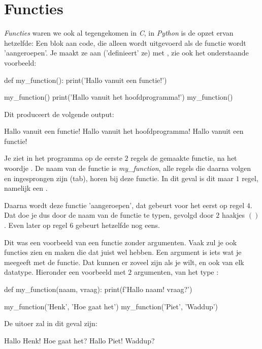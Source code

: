 \newpage

\section{Functies}
\textit{Functies} waren we ook al tegengekomen in \textit{C}, in \textit{Python} is de opzet ervan hetzelfde: Een blok aan code, die alleen wordt uitgevoerd als de functie wordt 'aangeroepen'. Je maakt ze aan ('definieert' ze) met , zie ook het onderstaande voorbeeld:

\begin{python}
def my_function():
    print('Hallo vanuit een functie!') 

my_function()
print('Hallo vanuit het hoofdprogramma!')
my_function()
\end{python}

Dit produceert de volgende output:

\begin{python}
Hallo vanuit een functie!
Hallo vanuit het hoofdprogramma!
Hallo vanuit een functie!
\end{python}

Je ziet in het programma op de eerste $2$ regels de gemaakte functie, na het woordje . De naam van de functie is \textit{my\_function}, alle regels die daarna volgen en ingesprongen zijn (tab), horen bij deze functie. 
In dit geval is dit maar $1$ regel, namelijk een . 

Daarna wordt deze functie 'aangeroepen', dat gebeurt voor het eerst op regel $4$. Dat doe je dus door de naam van de functie te typen, gevolgd door $2$ haakjes $( )$. Even later op regel $6$ gebeurt hetzelfde nog eens. 

Dit was een voorbeeld van een functie zonder argumenten. Vaak zul je ook functies zien en maken die dat juist wel hebben. Een argument is iets wat je meegeeft met de functie. Dat kunnen er zoveel zijn als je wilt, en ook van elk datatype. Hieronder een voorbeeld met $2$ argumenten, van het type :

\begin{python}
def my_function(naam, vraag):
    print(f'Hallo {naam}! {vraag}?') 

my_function('Henk', 'Hoe gaat het')
my_function('Piet', 'Waddup')
\end{python}
De uitoer zal in dit geval zijn:
\begin{python}
Hallo Henk! Hoe gaat het?
Hallo Piet! Waddup?
\end{python}

